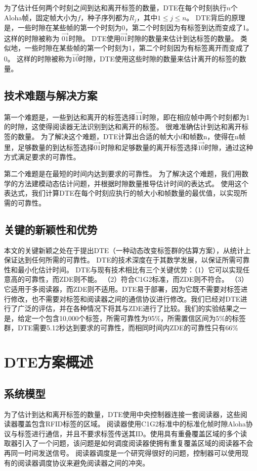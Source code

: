 \documentclass[UTF8]{ctexart}
\begin{document}
为了估计任何两个时刻之间到达和离开标签的数量，DTE在每个时刻执行$n$个Aloha帧，固定帧大小为$f$，种子序列都为$R_j$，其中$1\leq j\leq n$。 DTE背后的原理是，一些时隙在某些帧的第一个时刻为0，第二个时刻因为有标签到达而变成了1。 这样的时隙被称为 $\overrightarrow{01}$时隙。 DTE使用$\overrightarrow{01}$时隙的数量来估计到达标签的数量。 类似地，一些时隙在某些帧的第一个时刻为1，第二个时刻因为有标签离开而变成了0。 这样的时隙被称为$\overrightarrow{10}$时隙，DTE使用这些时隙的数量来估计离开的标签的数量。

\subsection{技术难题与解决方案}
第一个难题是，一些到达和离开的标签选择$\overrightarrow{11}$时隙，即在相应帧中两个时刻都为1的时隙，这使得阅读器无法识别到达和离开的标签。 很难准确估计到达和离开标签的数量。 为了解决这个难题，DTE计算出合适的帧大小f和帧数n，使得在n帧里，足够数量的到达标签选择$\overrightarrow{01}$时隙和足够数量的离开标签选择$\overrightarrow{10}$时隙，通过这种方式满足要求的可靠性。

第二个难题是在最短的时间内达到要求的可靠性。 为了解决这个难题，我们用数学的方法建模动态估计问题，并根据时隙数量推导估计时间的表达式。 使用这个表达式，我们计算DTE在每个时刻应执行的帧大小和帧数量的最优值，以实现所需的可靠性。

\subsection{关键的新颖性和优势}
本文的关键新颖之处在于提出DTE（一种动态改变标签群的估算方案），从统计上保证达到任何所需的可靠性。 DTE的技术深度在于其数学发展，以保证所需可靠性和最小化估计时间。 DTE与现有技术相比有三个关键优势：（1）它可以实现任意高的可靠性，而ZDE则不能。 （2）符合C1G2标准，而ZDE则不符合。 （3）它适用于多阅读器，而ZDE则不适用。DTE易于部署，因为它既不需要对标签进行修改，也不需要对标签和阅读器之间的通信协议进行修改。我们已经对DTE进行了广泛的评估，并在各种情况下将其与ZDE进行了比较。我们的实验结果之一是，给定一个包含10,000个标签，所需可靠性为95\%，所需置信区间为5\%的标签群，DTE需要5.12秒达到要求的可靠性，而相同时间内ZDE的可靠性只有66\%
	
\section{DTE方案概述}
\subsection{系统模型}
为了估计到达和离开标签的数量，DTE使用中央控制器连接一套阅读器，这些阅读器覆盖包含RFID标签的区域。 阅读器使用C1G2标准中的标准化帧时隙Aloha协议与标签进行通信，并且不要求标签传送其ID。使用具有重叠覆盖区域的多个读取器引入了一个问题，该问题是如何调度阅读器使拥有重复覆盖区域的阅读器不会再同一时间发送信号。 阅读器调度是一个研究得很好的问题，控制器可以使用现有的阅读器调度协议来避免阅读器之间的冲突。
\end{document}
